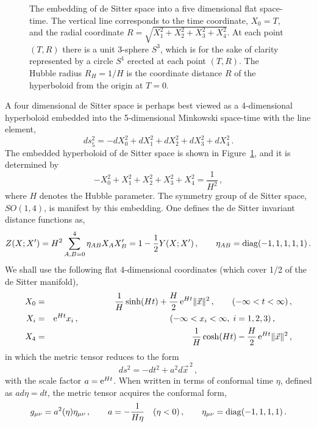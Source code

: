 \documentclass[aps,12pt,superscriptaddress,preprintnumbers,
                secnumarabic,nofootinbib,showpacs]{revtex4}
\newcommand{\lbfig}[1]{\refstepcounter{fig} \label{#1} }
\newcounter{fig}
\begin{document}
\begin{figure}[tbp]
\vskip -0.1in
\begin{center}
\end{center}
\lbfig{figure 1}
\vskip -0.3in
\caption[fig0]{
\small
The embedding of de Sitter space into a five dimensional flat space-time.
The vertical line corresponds to the time coordinate, $X_0=T$,
and the radial coordinate $R=\sqrt{X_1^2+X_2^2+X_3^2+X_4^2}$.
 At each point $(T,R)$ there is a unit 3-sphere $S^3$, which is for
the sake of clarity represented by a circle $S^1$ erected at each
point $(T,R)$. The Hubble radius $R_H=1/H$
is the coordinate distance $R$ of the hyperboloid from the origin at $T=0$.
}
\end{figure}
A four dimensional de  Sitter space is perhaps best viewed as a 4-dimensional
hyperboloid embedded into the 5-dimensional Minkowski space-time
with the line element,
\begin{equation}
 ds_5^2 =  - dX_0 ^2 + dX_1^2 + dX_2^2 + dX_3^2 + dX_4^2
\label{dS:5 dim}
\,.
\end{equation}
The embedded hyperboloid of de Sitter space is shown in
Figure~\ref{figure 1}, and it is determined by
\begin{equation}
\label{dS:hyperboloid}
 - X_0^2 + X_1^2 + X_2^2 + X_3^2 + X_4^2  = \frac{1}{H^2}
\,,
\end{equation}
where $H$ denotes the Hubble parameter.
The symmetry group of de Sitter space,
$SO(1,4)$, is manifest by this embedding. One defines the de Sitter
invariant distance functions as,
\begin{equation}
 Z(X;X^\prime) = H^2 \sum_{A,B=0}^4\eta_{AB}X_A X^\prime_B
               = 1 - \frac{1}{2}Y(X;X^\prime)
\,,\qquad
\eta_{AB} = {\rm diag}(-1,1,1,1,1)
\,.
\label{invariant distance}
\end{equation}
We shall use the following flat 4-dimensional coordinates (which
cover 1/2 of the de Sitter manifold),
\begin{eqnarray}
  X_0 &=& \frac{1}{H}\sinh(Ht)+\frac{H}{2}\,{\rm e}^{Ht}\|\vec x\|^2
  \,,\qquad
            (-\infty < t < \infty)\,,
\nonumber\\
 X_i &=& {\rm e}^{Ht}x_i
  \,,\qquad\qquad\qquad\qquad\qquad\quad\!\!
            (-\infty < x_i < \infty,\; i=1,2,3)\,,\qquad
\nonumber\\
 X_4 &=& \frac{1}{H}\cosh(Ht)-\frac{H}{2}\,{\rm e}^{Ht}\|\vec x\|^2
\,,
\label{dS:flat coordinates}
\end{eqnarray}
in which the metric tensor reduces to the form
\begin{equation}
ds^2 = -dt^2 + a^2d\vec{x}^{\,2}\,,
\end{equation}
with the scale factor $a={\rm e}^{Ht}$. When written in terms of
conformal time $\eta$, defined as $ad\eta = dt$, the metric tensor
acquires the conformal form,
\begin{equation}
 g_{\mu\nu} = a^2(\eta) \eta_{\mu\nu}
\,,\qquad
 a = -\frac{1}{H\eta} \quad (\eta<0)
\,,\qquad
\eta_{\mu\nu} = {\rm diag}(-1,1,1,1)
\,.
\label{dS:scale factor}
\end{equation}
\end{document}
